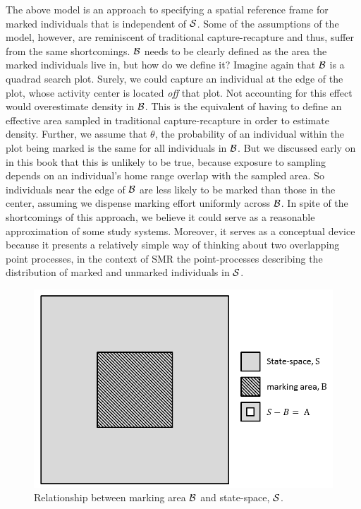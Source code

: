 The above 
model is an approach to specifying a spatial reference frame for
marked individuals that is independent of ${\cal S}$.
Some of the assumptions of the model, however, are reminiscent of traditional capture-recapture and thus, suffer from the same shortcomings. ${\cal B}$ needs to be clearly defined as the area the marked individuals live in, but how do we define it? Imagine again that ${\cal B}$ is a quadrad search plot. Surely, we could capture an individual at the edge of the plot, whose activity center is located \emph{off} that plot. Not accounting for this effect would overestimate density in ${\cal B}$. This is the equivalent of having to define an effective area sampled in traditional capture-recapture in order to estimate density. Further, we assume that $\theta$, the probability of an individual within the plot being marked is the same for all individuals in ${\cal B}$. But we discussed early on in this book that this is unlikely to be true, because exposure to sampling depends on an individual's home range overlap with the sampled area. So individuals near the edge of ${\cal B}$ are less likely to be marked than those in the center, assuming we dispense marking effort uniformly across ${\cal B}$. In spite of the shortcomings of this approach, we believe it could serve as a reasonable approximation of some study systems. Moreover, it serves as a conceptual device because it presents a relatively simple way of thinking about two overlapping point processes, in the context of SMR the point-processes describing the distribution of marked and unmarked individuals in  ${\cal S}$.    


\begin{figure}[ht]
\begin{center}
\includegraphics[width=5in]{Ch19-PartialID/figs/scrPIDBox.png}
\end{center}
\caption{
Relationship between marking area ${\cal B}$ and state-space, ${\cal S}$.
}
\label{partialID.fig.Box}
\end{figure}

